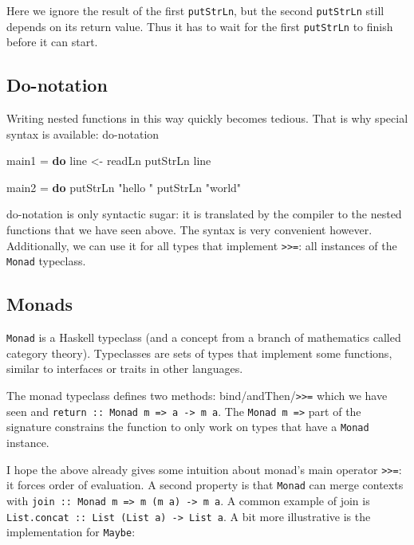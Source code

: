\documentclass[runningheads,plain]{llncs}
\newenvironment{Shaded}{}{}
\newcommand{\KeywordTok}[1]{\textcolor[rgb]{0.00,0.44,0.13}{\textbf{#1}}}
\newcommand{\StringTok}[1]{\textcolor[rgb]{0.25,0.44,0.63}{#1}}
\newcommand{\OtherTok}[1]{\textcolor[rgb]{0.00,0.44,0.13}{#1}}
\newcommand{\FunctionTok}[1]{\textcolor[rgb]{0.02,0.16,0.49}{#1}}
\newcommand{\NormalTok}[1]{#1}
\begin{document}
Here we ignore the result of the first \texttt{putStrLn}, but the second
\texttt{putStrLn} still depends on its return value. Thus it has to wait
for the first \texttt{putStrLn} to finish before it can start.

\subsection{Do-notation}\label{do-notation}

Writing nested functions in this way quickly becomes tedious. That is
why special syntax is available: do-notation

\begin{Shaded}
\begin{Highlighting}[]
\NormalTok{main1 }\FunctionTok{=} \KeywordTok{do}
\NormalTok{    line }\OtherTok{<-}\NormalTok{ readLn}
\NormalTok{    putStrLn line}

\NormalTok{main2 }\FunctionTok{=} \KeywordTok{do}
\NormalTok{    putStrLn }\StringTok{"hello "}
\NormalTok{    putStrLn }\StringTok{"world"}
\end{Highlighting}
\end{Shaded}

do-notation is only syntactic sugar: it is translated by the compiler to
the nested functions that we have seen above. The syntax is very
convenient however. Additionally, we can use it for all types that
implement \texttt{\textgreater{}\textgreater{}=}: all instances of the
\texttt{Monad} typeclass.

\subsection{Monads}\label{monads}

\texttt{Monad} is a Haskell typeclass (and a concept from a branch of
mathematics called category theory). Typeclasses are sets of types that
implement some functions, similar to interfaces or traits in other
languages.

The monad typeclass defines two methods:
bind/andThen/\texttt{\textgreater{}\textgreater{}=} which we have seen
and
\texttt{return\ ::\ Monad\ m\ =\textgreater{}\ a\ -\textgreater{}\ m\ a}.
The \texttt{Monad\ m\ =\textgreater{}} part of the signature constrains
the function to only work on types that have a \texttt{Monad} instance.

I hope the above already gives some intuition about monad's main
operator \texttt{\textgreater{}\textgreater{}=}: it forces order of
evaluation. A second property is that \texttt{Monad} can merge contexts
with
\texttt{join\ ::\ Monad\ m\ =\textgreater{}\ m\ (m\ a)\ -\textgreater{}\ m\ a}.
A common example of join is
\texttt{List.concat\ ::\ List\ (List\ a)\ -\textgreater{}\ List\ a}. A
bit more illustrative is the implementation for \texttt{Maybe}:
\end{document}
